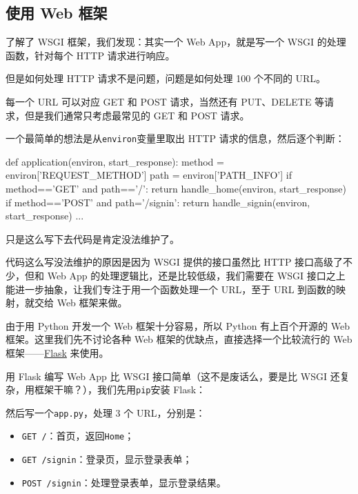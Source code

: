 \hypertarget{ux4f7fux7528-web-ux6846ux67b6}{%
\subsection{使用 Web 框架}\label{ux4f7fux7528-web-ux6846ux67b6}}

了解了 WSGI 框架，我们发现：其实一个 Web App，就是写一个 WSGI
的处理函数，针对每个 HTTP 请求进行响应。

但是如何处理 HTTP 请求不是问题，问题是如何处理 100 个不同的 URL。

每一个 URL 可以对应 GET 和 POST 请求，当然还有 PUT、DELETE
等请求，但是我们通常只考虑最常见的 GET 和 POST 请求。

一个最简单的想法是从\texttt{environ}变量里取出 HTTP
请求的信息，然后逐个判断：

\begin{pythoncode}
def application(environ, start_response):
    method = environ['REQUEST_METHOD']
    path = environ['PATH_INFO']
    if method=='GET' and path=='/':
        return handle_home(environ, start_response)
    if method=='POST' and path='/signin':
        return handle_signin(environ, start_response)
    ...
\end{pythoncode}

只是这么写下去代码是肯定没法维护了。

代码这么写没法维护的原因是因为 WSGI 提供的接口虽然比 HTTP
接口高级了不少，但和 Web App 的处理逻辑比，还是比较低级，我们需要在 WSGI
接口之上能进一步抽象，让我们专注于用一个函数处理一个 URL，至于 URL
到函数的映射，就交给 Web 框架来做。

由于用 Python 开发一个 Web 框架十分容易，所以 Python 有上百个开源的 Web
框架。这里我们先不讨论各种 Web 框架的优缺点，直接选择一个比较流行的 Web
框架------\href{http://flask.pocoo.org/}{Flask} 来使用。

用 Flask 编写 Web App 比 WSGI 接口简单（这不是废话么，要是比 WSGI
还复杂，用框架干嘛？），我们先用\texttt{pip}安装 Flask：


然后写一个\texttt{app.py}，处理 3 个 URL，分别是：

\begin{itemize}
\item
  \texttt{GET\ /}：首页，返回\texttt{Home}；
\item
  \texttt{GET\ /signin}：登录页，显示登录表单；
\item
  \texttt{POST\ /signin}：处理登录表单，显示登录结果。
\end{itemize}

